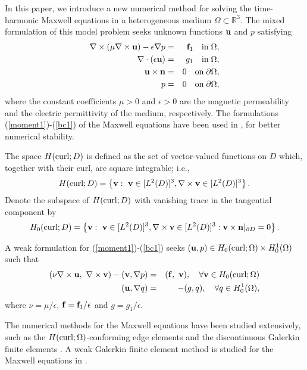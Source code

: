 \documentclass[11pt]{amsart}
\newcommand{\bu}{{\bf u}}
\newcommand{\bv}{{\bf v}}
\def\bn{{\bf n}}
\begin{document}
In this paper, we introduce a new numerical
method  for solving the time-harmonic Maxwell equations in a heterogeneous
medium $\Omega\subset \mathbb{R}^3$. The mixed formulation of this model problem seeks unknown
functions $\bu$ and $p$ satisfying
\begin{eqnarray}\label{model}
\nabla\times(\mu\nabla\times \bu)-\epsilon\nabla p &=&{\bf f}_1\quad \mbox{in}\;\Omega,\label{moment1}\\
\nabla\cdot(\epsilon\bu)&=&g_1\quad\mbox{in}\;\Omega,\label{cont1}\\
\bu\times\bn &=& 0\quad\mbox{on}\;\partial\Omega,\label{bcc1}\\
p&=&0\quad\mbox{on}\;\partial\Omega,\label{bc1}
\end{eqnarray}
where the constant coefficients $\mu>0$ and $\epsilon>0$ are the magnetic
permeability and the electric permittivity of the medium,
respectively.
The formulations (\ref{moment1})-(\ref{bc1}) of the Maxwell equations
  have been used in \cite{Mu-W-Y-Z,ps, psm,vd}, for better numerical stability.

The space $H(\hbox{curl};D)$ is defined as the set of vector-valued
functions on $D$ which, together with their curl, are square
integrable; i.e.,
\[
H({\rm curl}; D)=\left\{ \bv: \ \bv\in [L^2(D)]^3, \nabla\times\bv \in
[L^2(D)]^3\right\}.
\]
Denote
the subspace of 
$H({\rm curl}; D)$ with vanishing trace in the tangential component by
\[
H_0({\rm curl}; D)=\left\{ \bv: \ \bv\in [L^2(D)]^3, \nabla\times\bv \in
[L^2(D)]^3: \bv\times \bn|_{\partial D}=0 \right\}.
\]

A weak formulation for (\ref{moment1})-(\ref{bc1}) seeks $(\bu, p)
\in H_0(\hbox{curl};\Omega) \times H_0^1(\Omega)$ such that
\begin{eqnarray}\label{weakform}
(\nu\nabla\times\bu,\ \nabla\times\bv)-(\bv,\nabla p)&=&({\bf f},\  \bv),
\quad \forall \bv \in H_0(\hbox{curl};\Omega)\label{w1}\\
(\bu,\nabla q)&=&-(g,q),\quad\forall q\in H_0^1(\Omega),\label{w2}
\end{eqnarray}
where $\nu=\mu/\epsilon$, ${\bf f}={\bf f}_1/\epsilon$ and
$g=g_1/\epsilon$.


The numerical methods for the Maxwell equations have been studied extensively,
such as the $H(\hbox{curl};\Omega)$-conforming edge elements
\cite{boss,jin,monk, Nedelec, Nedelec1} and the discontinuous Galerkin
finite elements \cite{bls,bcnl, hps,hps-1,hps-2, ps,psm}.  
A weak Galerkin finite element method is studied for the Maxwell equations
 in \cite{Mu-W-Y-Z}.
\end{document}
